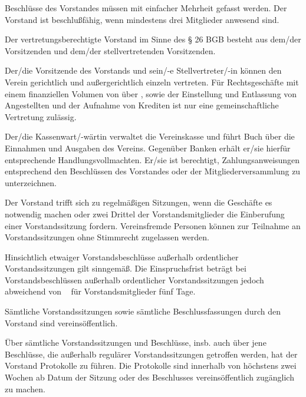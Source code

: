 \documentclass[draft]{scrartcl}
\begin{document}
\begin{contract}
Beschlüsse des Vorstandes müssen mit einfacher Mehrheit gefasst werden. Der
Vorstand ist beschlußfähig, wenn mindestens drei Mitglieder anwesend sind.


Der vertretungsberechtigte Vorstand im Sinne des § 26 BGB besteht aus dem/der
Vorsitzenden und dem/der stellvertretenden Vorsitzenden.

Der/die Vorsitzende des Vorstands und sein/-e Stellvertreter/-in können den
Verein gerichtlich und außergerichtlich einzeln vertreten. Für Rechtsgeschäfte
mit einem finanziellen Volumen von über , sowie der Einstellung und
Entlassung von Angestellten und der Aufnahme von Krediten ist nur eine
gemeinschaftliche Vertretung zulässig.

Der/die Kassenwart/-wärtin verwaltet die Vereinskasse und führt Buch über die
Einnahmen und Ausgaben des Vereins. Gegenüber Banken erhält er/sie hierfür
entsprechende Handlungsvollmachten. Er/sie ist berechtigt, Zahlungsanweisungen
entsprechend den Beschlüssen des Vorstandes oder der Mitgliederversammlung zu
unterzeichnen.


Der Vorstand trifft sich zu regelmäßigen Sitzungen, wenn die Geschäfte es
notwendig machen oder zwei Drittel der Vorstandsmitglieder die Einberufung
einer Vorstandssitzung fordern. Vereinsfremde Personen können zur Teilnahme
an Vorstandssitzungen ohne Stimmrecht zugelassen werden.

Hinsichtlich etwaiger Vorstandsbeschlüsse außerhalb ordentlicher Vorstandssitzungen
gilt  sinngemäß. Die Einspruchsfrist
beträgt bei Vorstandsbeschlüssen außerhalb ordentlicher Vorstandssitzungen jedoch
abweichend von ~ für
Vorstandsmitglieder fünf Tage.

Sämtliche Vorstandssitzungen sowie sämtliche Beschlussfassungen durch
den Vorstand sind vereinsöffentlich.

Über sämtliche Vorstandssitzungen und Beschlüsse, insb. auch über jene
Beschlüsse, die außerhalb regulärer Vorstandssitzungen getroffen werden, hat
der Vorstand Protokolle zu führen. Die Protokolle sind innerhalb von höchstens
zwei Wochen ab Datum der Sitzung oder des Beschlusses vereinsöffentlich
zu\-gäng\-lich zu machen.



\end{contract}
\end{document}
